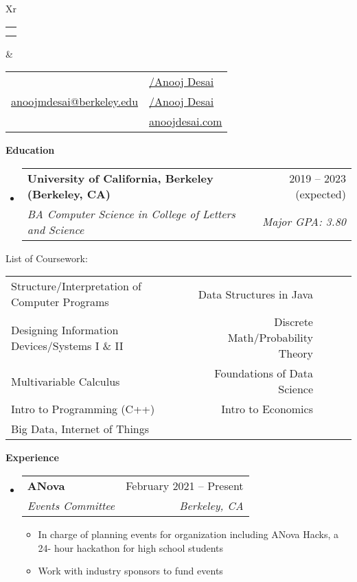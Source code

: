 \documentclass[letterpaper,8pt]{article}[leftmargin=*]
\makeatletter
\def \fullname {Anooj Desai}
\def \subtitle {}
\def \linkedinicon {\faLinkedin}
\def \linkedinlink {https://www.linkedin.com/in/anooj-desai-b9568219b/}
\def \linkedintext {/Anooj Desai}
\def \phoneicon {\faPhone}
\def \phonetext {+1-714-334-9017}
\def \emailicon {\faEnvelope}
\def \emaillink {mailto:anoojmdesai@berkeley.edu}
\def \emailtext {anoojmdesai@berkeley.edu}
\def \githubicon {\faGithub}
\def \githublink {https://github.com/AnoojD}
\def \githubtext {/Anooj Desai}
\def \websiteicon {\faGlobe}
\def \websitelink {https://www.anoojdesai.com/}
\def \websitetext {anoojdesai.com}
\def \headertype {\doublecol} %
\def \linkedin {\linkedinicon \hspace{3pt}\href{\linkedinlink}{\linkedintext}}
\def \phone {\phoneicon \hspace{3pt}{ \phonetext}}
\def \email {\emailicon \hspace{3pt}\href{\emaillink}{\emailtext}}
\def \github {\githubicon \hspace{3pt}\href{\githublink}{\githubtext}}
\def \website {\websiteicon \hspace{3pt}\href{\websitelink}{\websitetext}}
\renewcommand{\section}[2]{\vspace{2pt}
  \colorbox{secondary}{\color{white}\raggedbottom\normalsize\textbf{{#1}{\hspace{7pt}#2}}}
}
\newcommand{\resumeEntryStart}{\begin{itemize}[leftmargin=2.5mm]}
\newcommand{\resumeEntryEnd}{\end{itemize}\vspace{0pt}}
\newcommand{\resumeItemListStart}{\begin{itemize}[leftmargin=4.5mm]}
\newcommand{\resumeItemListEnd}{\end{itemize} \vspace{0pt}}
\newcommand{\resumeItem}[1]{
  \item\small{
    {#1 \vspace{-3pt}}
  }
}
\newcommand{\resumeEntryTSDL}[4]{
  \vspace{0pt}\item[]
    \begin{tabularx}{0.97\textwidth}{X@{\hspace{60pt}}r}
      \textbf{\color{primary}#1} & {\firabook\color{accent}\small#2} \\
      \textit{\color{accent}\small#3} & \textit{\color{accent}\small#4} \\
    \end{tabularx}\vspace{-8pt}
}
\newcommand{\doublecol}[6]{
  \begin{tabularx}{\textwidth}{Xr}
    {
      \begin{tabular}[c]{l}
        \fontsize{35}{45}\selectfont{\color{primary}{{\textbf{\fullname}}}} \\
        {\textit{\subtitle}} %
      \end{tabular}
    } & {
      \begin{tabular}[c]{l@{\hspace{1.5em}}l}
        {\small#4} & {\small#1} \\
        {\small#5} & {\small#2} \\
        {\small#6} & {\small#3}
      \end{tabular}
    }
  \end{tabularx}
}
\newcommand{\singlecol}[6]{
  \begin{tabularx}{\textwidth}{Xr}
    {
      \begin{tabular}[b]{l}
        \fontsize{35}{45}\selectfont{\color{primary}{{\textbf{\fullname}}}} \\
        {\textit{\subtitle}} %
      \end{tabular}
    } & {
      \begin{tabular}[c]{l}
        {\small#1} \\
        {\small#2} \\
        {\small#3} \\
        {\small#4} \\
        {\small#5} \\
        {\small#6}
      \end{tabular}
    }
  \end{tabularx}
}
\makeatother
\begin{document}


\headertype{\linkedin}{\github}{\website}{\phone}{\email}{} %
\vspace{-13pt} %

\section{\faGraduationCap}{Education}

  \resumeEntryStart
    \resumeEntryTSDL
      {University of California, Berkeley (Berkeley, CA)}{2019 -- 2023 (expected)}
      {BA Computer Science in College of Letters and Science}{Major GPA: 3.80}
  \resumeEntryEnd
  
  
\resumeEntryStart
    {List of Coursework:}
\resumeEntryEnd
\resumeEntryStart
\begin{tabular}{lrlll}
Structure/Interpretation of Computer Programs & Data Structures in Java &  &  &  \\
Designing Information Devices/Systems I \& II & Discrete Math/Probability Theory &  &  &  \\
Multivariable Calculus & Foundations of Data Science &  &  &  \\
Intro to Programming (C++) & Intro to Economics &  &  &  \\
Big Data, Internet of Things &  &  &  & 
\end{tabular}
\resumeEntryEnd


\section{\faPieChart}{Experience}

  \resumeEntryStart
    \resumeEntryTSDL
      {ANova}{February 2021 -- Present}
      {Events Committee}{Berkeley, CA}
    \resumeItemListStart
      \resumeItem {In charge of planning events for organization including ANova Hacks, a 24- hour hackathon for high school students}
      \resumeItem {Work with industry sponsors to fund events}
    \resumeItemListEnd
  \resumeEntryEnd
\end{document}
